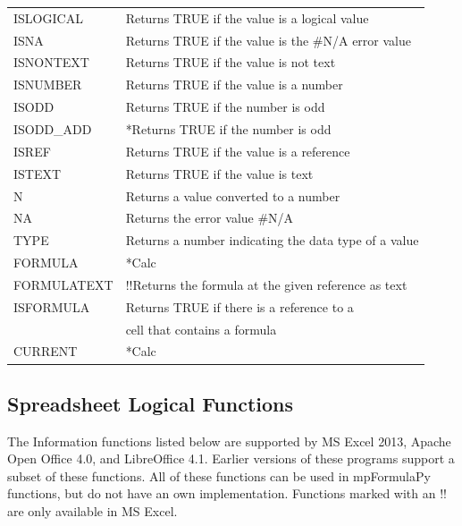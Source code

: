 \begin{center}
\begin{longtable}{l l }
		ISLOGICAL & Returns TRUE if the value is a logical value  \\
		ISNA  & Returns TRUE if the value is the \#N/A error value  \\
		ISNONTEXT & Returns TRUE if the value is not text \\
		ISNUMBER & Returns TRUE if the value is a number  \\
		ISODD & Returns TRUE if the number is odd  \\
		ISODD\_ADD & *Returns TRUE if the number is odd  \\
		ISREF & Returns TRUE if the value is a reference  \\
		ISTEXT & Returns TRUE if the value is text  \\
		N     & Returns a value converted to a number  \\
		NA    & Returns the error value \#N/A  \\
		TYPE  & Returns a number indicating the data type of a value  \\
		FORMULA   & *Calc  \\
		FORMULATEXT   & !!Returns the formula at the given reference as text  \\
		ISFORMULA  & Returns TRUE if there is a reference to a   \\
		& cell that contains a formula   \\
		CURRENT     & *Calc  \\
	\end{longtable}
\end{center}



\newpage 
\subsection{Spreadsheet Logical Functions}
The Information functions listed below are supported by MS Excel 2013, Apache Open Office 4.0, and LibreOffice 4.1. Earlier versions of these programs support a subset of these functions.
All of these functions can be used in mpFormulaPy functions, but do not have an own implementation. Functions marked with an !! are only available in MS Excel. 





